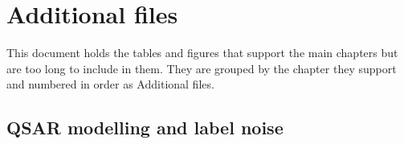 \chapter{Additional files}\label{app:additional}\label{app:noiseinject}\label{app:results}
\providecommand{\theHaddfile}{addfile.\arabic{addfile}}
\newcommand{\addfile}[1]{\par\FloatBarrier\Needspace*{0.3\textheight}\refstepcounter{addfile}\par\medskip\noindent\textbf{Additional file~\theaddfile: #1}\par\nopagebreak\smallskip}

This document holds the tables and figures that support the main chapters but are too long to include in them. They are grouped by the chapter they support and numbered in order as Additional files.

\section{QSAR modelling and label noise}\label{app:add:background}

